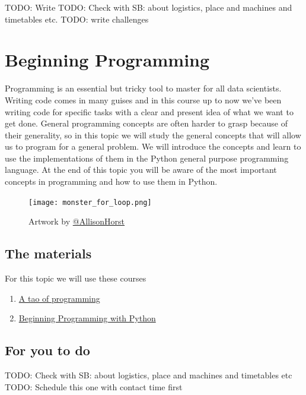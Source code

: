 \documentclass[
]{book}
\providecommand{\tightlist}{%
  \setlength{\itemsep}{0pt}\setlength{\parskip}{0pt}}
\begin{document}
TODO: Write
TODO: Check with SB: about logistics, place and machines and timetables etc.
TODO: write challenges

\hypertarget{beginning-programming}{%
\chapter{Beginning Programming}\label{beginning-programming}}

Programming is an essential but tricky tool to master for all data scientists. Writing code comes in many guises and in this course up to now we've been writing code for specific tasks with a clear and present idea of what we want to get done. General programming concepts are often harder to grasp because of their generality, so in this topic we will study the general concepts that will allow us to program for a general problem. We will introduce the concepts and learn to use the implementations of them in the Python general purpose programming language. At the end of this topic you will be aware of the most important concepts in programming and how to use them in Python.

\begin{figure}
\centering
\texttt{[image: monster\_for\_loop.png]}
\caption{\label{fig:unnamed-chunk-6}Artwork by \href{https://github.com/allisonhorst}{@AllisonHorst}}
\end{figure}

\hypertarget{the-materials-5}{%
\section{The materials}\label{the-materials-5}}

For this topic we will use these courses

\begin{enumerate}
\def\labelenumi{\arabic{enumi}.}
\tightlist
\item
  \href{https://danmaclean.github.io/tao_of_programming/}{A tao of programming}
\item
  \href{https://danmaclean.github.io/programming_with_python/}{Beginning Programming with Python}
\end{enumerate}

\hypertarget{for-you-to-do-5}{%
\section{For you to do}\label{for-you-to-do-5}}

TODO: Check with SB: about logistics, place and machines and timetables etc
TODO: Schedule this one with contact time first
\end{document}
